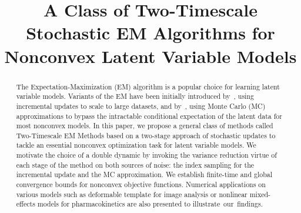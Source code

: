 \documentclass[bj]{imsart}
\numberwithin{equation}{section}
\theoremstyle{plain}
\begin{document}
\begin{frontmatter}
\title{A Class of Two-Timescale Stochastic EM Algorithms for Nonconvex Latent Variable Models}




\begin{abstract}
\noindent The Expectation-Maximization (EM) algorithm is a popular choice for learning latent variable models. 
Variants of the EM have been initially introduced by~\citet{neal1998view}, using incremental updates to scale to large datasets, and by~\citet{wei1990monte, delyon1999}, using Monte Carlo (MC) approximations to bypass the intractable conditional expectation of the latent data for most nonconvex models.
In this paper, we propose a general class of methods called Two-Timescale EM Methods based on a two-stage approach of stochastic updates to tackle an essential nonconvex optimization task for latent variable models.
We motivate the choice of a double dynamic by invoking the variance reduction virtue of each stage of the method on both sources of noise: the index sampling for the incremental update and the MC approximation.
We establish finite-time and global convergence bounds for nonconvex objective functions.
Numerical applications on various models such as deformable template for {image analysis} or nonlinear mixed-effects models for {pharmacokinetics} are also presented to illustrate~our~findings.\\
\end{abstract}



\begin{keyword}
\end{keyword}
\end{frontmatter}
\end{document}

